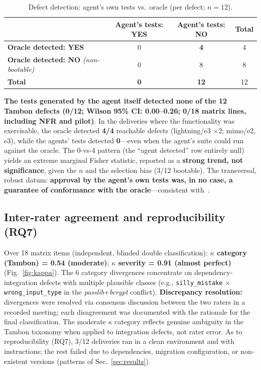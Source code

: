 \documentclass[11pt]{article}
\begin{document}
\begin{table}[htbp]
  \centering
  \caption{Defect detection: agent's own tests vs.\ oracle (per defect; $n=12$).}
  \label{tab:detect}
  \begin{tabular}{lccc}
    \toprule
    & Agent's tests: YES & Agent's tests: NO & Total \\
    \midrule
    \textbf{Oracle detected: YES} & 0 & \textbf{4} & 4 \\
    \textbf{Oracle detected: NO} \emph{(non-bootable)} & 0 & 8 & 8 \\
    \textbf{Total} & \textbf{0} & \textbf{12} & 12 \\
    \bottomrule
  \end{tabular}
\end{table}

\textbf{The tests generated by the agent itself detected none of the 12 Tambon defects (0/12; Wilson 95\% CI: 0.00--0.26; 0/18 matrix lines, including NFR and pilot)}. In the deliveries where the functionality was exercisable, the oracle detected \textbf{4/4} reachable defects (lightning/e3 $\times$2; mimo/e2, e3), while the agents' tests detected \textbf{0}---even when the agent's suite could run against the oracle. The 0-vs-4 pattern (the ``agent detected'' row entirely null) yields an extreme marginal Fisher statistic, reported as a \textbf{strong trend, not significance}, given the $n$ and the selection bias (3/12 bootable). The transversal, robust datum: \textbf{approval by the agent's own tests was, in no case, a guarantee of conformance with the oracle}---consistent with~\cite{C03,C04,C05,C06}.

\subsection{Inter-rater agreement and reproducibility (RQ7)}

Over 18 matrix items (independent, blinded double classification): \textbf{$\kappa$ category (Tambon) = 0.54 (moderate)}; \textbf{$\kappa$ severity = 0.91 (almost perfect)} (Fig.~\ref{fig:kappa}). The 6 category divergences concentrate on dependency-integration defects with multiple plausible classes (e.g., \texttt{silly\_mistake} $\times$ \texttt{wrong\_input\_type} in the \textit{passlib}+\textit{bcrypt} conflict). \textbf{Discrepancy resolution:} divergences were resolved via consensus discussion between the two raters in a recorded meeting; each disagreement was documented with the rationale for the final classification. The moderate $\kappa$ category reflects genuine ambiguity in the Tambon taxonomy when applied to integration defects, not rater error. As to reproducibility (RQ7), 3/12 deliveries ran in a clean environment and with instructions; the rest failed due to dependencies, migration configuration, or non-existent versions (patterns of Sec.~\ref{sec:results}).
\end{document}
